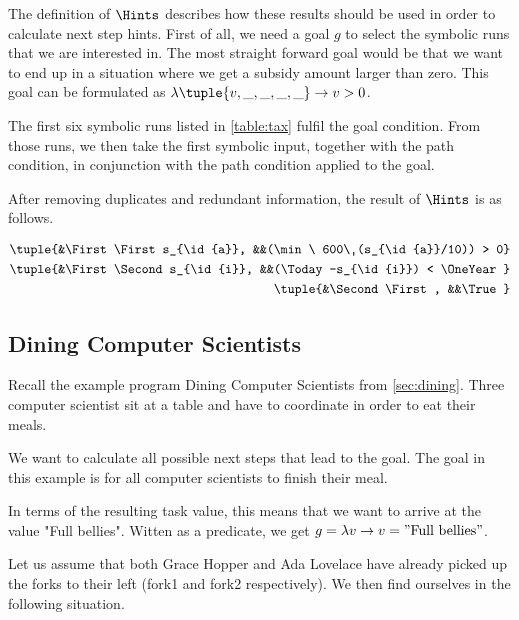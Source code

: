 The definition of $\Hints$ describes how these results should be used in order to calculate next step hints.
First of all, we need a goal $g$ to select the symbolic runs that we are interested in.
The most straight forward goal would be that we want to end up in a situation where we get a subsidy amount larger than zero.
This goal can be formulated as $\lambda \tuple{v,\_,\_,\_,\_}\rightarrow v>0$.

The first six symbolic runs listed in \cref{table:tax} fulfil the goal condition.
From those runs, we then take the first symbolic input, together with the path condition, in conjunction with the path condition applied to the goal.

After removing duplicates and redundant information, the result of $\Hints$ is as follows.

\begin{align*}
  \tuple{&\First \First s_{\id{a}},  &&(\min\ 600\ (s_{\id{a}}/10)) > 0} &\\
  \tuple{&\First \Second s_{\id{i}}, &&(\Today-s_{\id{i}}) < \OneYear} &\\
  \tuple{&\Second \First,            &&\True} &
\end{align*}



\subsection{Dining Computer Scientists}
\label{sub:assistive-dining}

Recall the example program Dining Computer Scientists from \cref{sec:dining}.
Three computer scientist sit at a table and have to coordinate in order to eat their meals.

We want to calculate all possible next steps that lead to the goal.
The goal in this example is for all computer scientists to finish their meal.

In terms of the resulting task value, this means that we want to arrive at the value "Full bellies".
Witten as a predicate, we get $g=\lambda v\rightarrow v = "\text{Full bellies}"$.

Let us assume that both Grace Hopper and Ada Lovelace have already picked up the forks to their left (fork1 and fork2 respectively).
We then find ourselves in the following situation.


